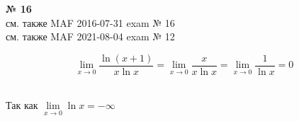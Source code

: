 \documentclass{article}
\begin{document}
\textbf{№ 16} 
\\
см. также MAF 2016-07-31 exam № 16 \\
см. также MAF 2021-08-04 exam № 12

$$ \lim\limits_{x \to 0} \frac{\ln{(x+1)}}{x\ln{x}}
= \lim\limits_{x \to 0} \frac{x}{x\ln{x}}
= \lim\limits_{x \to 0} \frac{1}{\ln{x}} 
= 0 $$

\\
Так как $ \lim\limits_{x \to 0} \ln{x} = -\infty$
\end{document}
